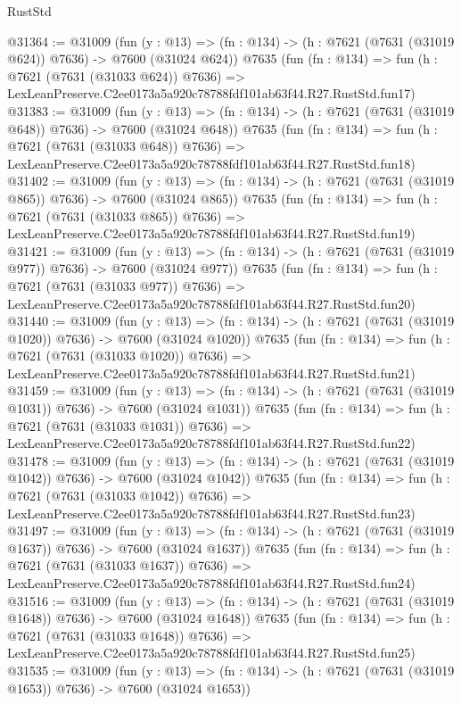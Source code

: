 \begin{lexlean}{RustStd}
\begin{coremodule}
@31364 := @31009
    (fun (y : @13) => (fn : @134) -> (h : @7621 (@7631 (@31019 @624)) @7636) -> @7600 (@31024 @624))
    @7635
    (fun (fn : @134) =>
    fun (h : @7621 (@7631 (@31033 @624)) @7636) =>
    LexLeanPreserve.C2ee0173a5a920c78788fdf101ab63f44.R27.RustStd.fun17)
@31383 := @31009
    (fun (y : @13) => (fn : @134) -> (h : @7621 (@7631 (@31019 @648)) @7636) -> @7600 (@31024 @648))
    @7635
    (fun (fn : @134) =>
    fun (h : @7621 (@7631 (@31033 @648)) @7636) =>
    LexLeanPreserve.C2ee0173a5a920c78788fdf101ab63f44.R27.RustStd.fun18)
@31402 := @31009
    (fun (y : @13) => (fn : @134) -> (h : @7621 (@7631 (@31019 @865)) @7636) -> @7600 (@31024 @865))
    @7635
    (fun (fn : @134) =>
    fun (h : @7621 (@7631 (@31033 @865)) @7636) =>
    LexLeanPreserve.C2ee0173a5a920c78788fdf101ab63f44.R27.RustStd.fun19)
@31421 := @31009
    (fun (y : @13) => (fn : @134) -> (h : @7621 (@7631 (@31019 @977)) @7636) -> @7600 (@31024 @977))
    @7635
    (fun (fn : @134) =>
    fun (h : @7621 (@7631 (@31033 @977)) @7636) =>
    LexLeanPreserve.C2ee0173a5a920c78788fdf101ab63f44.R27.RustStd.fun20)
@31440 := @31009
    (fun (y : @13) =>
    (fn : @134) -> (h : @7621 (@7631 (@31019 @1020)) @7636) -> @7600 (@31024 @1020))
    @7635
    (fun (fn : @134) =>
    fun (h : @7621 (@7631 (@31033 @1020)) @7636) =>
    LexLeanPreserve.C2ee0173a5a920c78788fdf101ab63f44.R27.RustStd.fun21)
@31459 := @31009
    (fun (y : @13) =>
    (fn : @134) -> (h : @7621 (@7631 (@31019 @1031)) @7636) -> @7600 (@31024 @1031))
    @7635
    (fun (fn : @134) =>
    fun (h : @7621 (@7631 (@31033 @1031)) @7636) =>
    LexLeanPreserve.C2ee0173a5a920c78788fdf101ab63f44.R27.RustStd.fun22)
@31478 := @31009
    (fun (y : @13) =>
    (fn : @134) -> (h : @7621 (@7631 (@31019 @1042)) @7636) -> @7600 (@31024 @1042))
    @7635
    (fun (fn : @134) =>
    fun (h : @7621 (@7631 (@31033 @1042)) @7636) =>
    LexLeanPreserve.C2ee0173a5a920c78788fdf101ab63f44.R27.RustStd.fun23)
@31497 := @31009
    (fun (y : @13) =>
    (fn : @134) -> (h : @7621 (@7631 (@31019 @1637)) @7636) -> @7600 (@31024 @1637))
    @7635
    (fun (fn : @134) =>
    fun (h : @7621 (@7631 (@31033 @1637)) @7636) =>
    LexLeanPreserve.C2ee0173a5a920c78788fdf101ab63f44.R27.RustStd.fun24)
@31516 := @31009
    (fun (y : @13) =>
    (fn : @134) -> (h : @7621 (@7631 (@31019 @1648)) @7636) -> @7600 (@31024 @1648))
    @7635
    (fun (fn : @134) =>
    fun (h : @7621 (@7631 (@31033 @1648)) @7636) =>
    LexLeanPreserve.C2ee0173a5a920c78788fdf101ab63f44.R27.RustStd.fun25)
@31535 := @31009
    (fun (y : @13) =>
    (fn : @134) -> (h : @7621 (@7631 (@31019 @1653)) @7636) -> @7600 (@31024 @1653))

\end{coremodule}
\end{lexlean}
